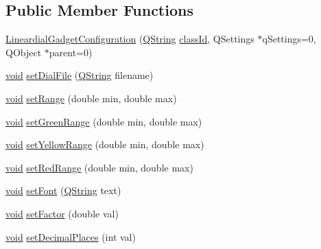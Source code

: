 \subsection*{\-Public \-Member \-Functions}
\begin{DoxyCompactItemize}
\item 
\hyperlink{group___linear_dial_plugin_ga49b8e3de979573e8574a47a355fb537f}{\-Lineardial\-Gadget\-Configuration} (\hyperlink{group___u_a_v_objects_plugin_gab9d252f49c333c94a72f97ce3105a32d}{\-Q\-String} \hyperlink{group___core_plugin_gac953657221ba7fda967ada0408332641}{class\-Id}, \-Q\-Settings $\ast$q\-Settings=0, \-Q\-Object $\ast$parent=0)
\item 
\hyperlink{group___u_a_v_objects_plugin_ga444cf2ff3f0ecbe028adce838d373f5c}{void} \hyperlink{group___linear_dial_plugin_ga20902ca5cb846c1c93ac9d0ef3799eca}{set\-Dial\-File} (\hyperlink{group___u_a_v_objects_plugin_gab9d252f49c333c94a72f97ce3105a32d}{\-Q\-String} filename)
\item 
\hyperlink{group___u_a_v_objects_plugin_ga444cf2ff3f0ecbe028adce838d373f5c}{void} \hyperlink{group___linear_dial_plugin_gaa4baee59ed6a862a9c31f64b2349acdc}{set\-Range} (double min, double max)
\item 
\hyperlink{group___u_a_v_objects_plugin_ga444cf2ff3f0ecbe028adce838d373f5c}{void} \hyperlink{group___linear_dial_plugin_ga126eafb9e37022d0160d544665e9687d}{set\-Green\-Range} (double min, double max)
\item 
\hyperlink{group___u_a_v_objects_plugin_ga444cf2ff3f0ecbe028adce838d373f5c}{void} \hyperlink{group___linear_dial_plugin_gae1437ef9469c5a813ad0c76f04b186d2}{set\-Yellow\-Range} (double min, double max)
\item 
\hyperlink{group___u_a_v_objects_plugin_ga444cf2ff3f0ecbe028adce838d373f5c}{void} \hyperlink{group___linear_dial_plugin_gab1a3bcf875948fdb2203a511b7245e36}{set\-Red\-Range} (double min, double max)
\item 
\hyperlink{group___u_a_v_objects_plugin_ga444cf2ff3f0ecbe028adce838d373f5c}{void} \hyperlink{group___linear_dial_plugin_ga1aedc8fa6dded9d30aacde381e4b068a}{set\-Font} (\hyperlink{group___u_a_v_objects_plugin_gab9d252f49c333c94a72f97ce3105a32d}{\-Q\-String} text)
\item 
\hyperlink{group___u_a_v_objects_plugin_ga444cf2ff3f0ecbe028adce838d373f5c}{void} \hyperlink{group___linear_dial_plugin_ga59dcd0145c59b1e63f4f004d1b8cc22a}{set\-Factor} (double val)
\item 
\hyperlink{group___u_a_v_objects_plugin_ga444cf2ff3f0ecbe028adce838d373f5c}{void} \hyperlink{group___linear_dial_plugin_gac027133a81aa51ae990681d8ece122e6}{set\-Decimal\-Places} (int val)

\end{DoxyCompactItemize}
